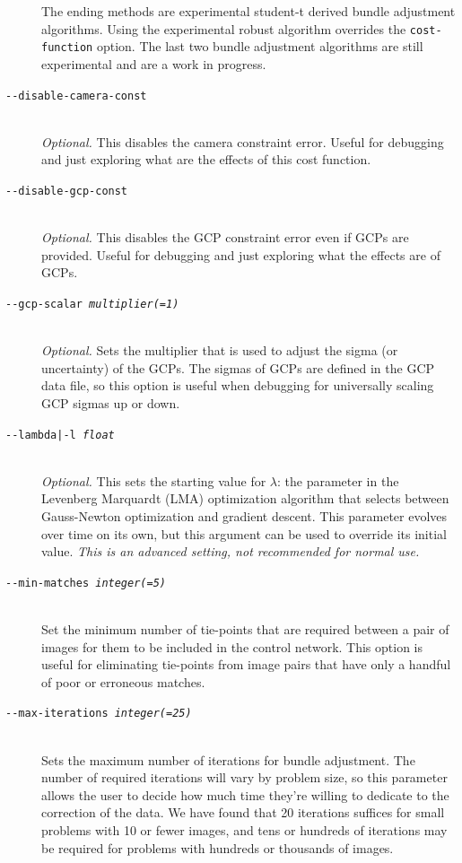 \begin{description}
  The ending methods are experimental student-t derived bundle
  adjustment algorithms. Using the experimental robust algorithm
  overrides the {\tt cost-function} option. The last two bundle
  adjustment algorithms are still experimental and are a work in
  progress.

\item[\texttt{-\/-disable-camera-const}] \hfill \\
  \emph{Optional.} This disables the camera constraint error. Useful
  for debugging and just exploring what are the effects of this cost
  function.

\item[\texttt{-\/-disable-gcp-const}] \hfill \\
  \emph{Optional.} This disables the \ac{GCP} constraint error even
  if \acp{GCP} are provided. Useful for debugging and just exploring
  what the effects are of \acp{GCP}.

\item[\texttt{-\/-gcp-scalar \textit{multiplier(=1)}}] \hfill \\
  \emph{Optional.} Sets the multiplier that is used to adjust the
  sigma (or uncertainty) of the \aclp{GCP}. The sigmas of
  \aclp{GCP} are defined in the \ac{GCP} data file, so this
  option is useful when debugging for universally scaling \ac{GCP} sigmas
  up or down.

\item[\texttt{-\/-lambda|-l \textit{float}}] \hfill \\
  \emph{Optional.} This sets the starting value for $\lambda$: the
  parameter in the Levenberg Marquardt (LMA) optimization algorithm
  that selects between Gauss-Newton optimization and gradient
  descent. This parameter evolves over time on its own, but this
  argument can be used to override its initial value. \emph{This is an
  advanced setting, not recommended for normal use.}

\item[\texttt{-\/-min-matches \textit{integer(=5)}}] \hfill \\
  Set the minimum number of tie-points that are required between a
  pair of images for them to be included in the control network. This
  option is useful for eliminating tie-points from image pairs that
  have only a handful of poor or erroneous matches.

\item[\texttt{-\/-max-iterations \textit{integer(=25)}}] \hfill \\
  Sets the maximum number of iterations for bundle adjustment. The
  number of required iterations will vary by problem size, so this
  parameter allows the user to decide how much time they're willing
  to dedicate to the correction of the data.  We have found that 20
  iterations suffices for small problems with 10 or fewer images, and
  tens or hundreds of iterations may be required for problems with
  hundreds or thousands of images.


\end{description}
